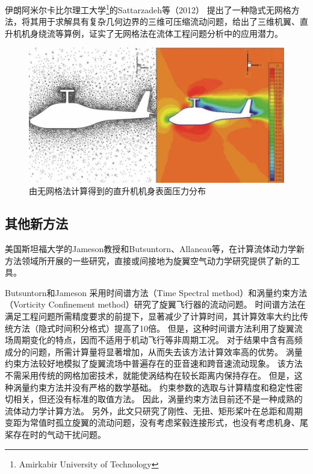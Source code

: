 \documentclass[doctor,openright,twoside,color]{buaathesis}
\begin{document}
伊朗阿米尔卡比尔理工大学\footnote{Amirkabir University of Technology}的Sattarzadeh等（2012）
提出了一种隐式无网格方法，将其用于求解具有复杂几何边界的三维可压缩流动问题，给出了三维机翼、直升机机身绕流等算例，证实了无网格法在流体工程问题分析中的应用潜力。
\begin{figure}[t!]
    \centering
    \includegraphics[height=0.3\textheight]{figures/meshless.jpg}
    \caption{由无网格法计算得到的直升机机身表面压力分布}
\end{figure}

\subsection{其他新方法}

美国斯坦福大学的Jameson教授和Butsuntorn、Allaneau等，在计算流体动力学新方法领域所开展的一些研究，直接或间接地为旋翼空气动力学研究提供了新的工具。

Butsuntorn和Jameson
采用时间谱方法（Time Spectral method）和涡量约束方法（Vorticity Confinement method）研究了旋翼飞行器的流动问题。
时间谱方法在满足工程问题所需精度要求的前提下，显著减少了计算时间，其计算效率大约比传统方法（隐式时间积分格式）提高了10倍。
但是，这种时间谱方法利用了旋翼流场周期变化的特点，因而不适用于机动飞行等非周期工况。
对于结果中含有高频成分的问题，所需计算量将显著增加，从而失去该方法计算效率高的优势。
涡量约束方法较好地模拟了旋翼流场中普遍存在的亚音速和跨音速流动现象。
该方法不需采用传统的网格加密技术，就能使涡结构在较长距离内保持存在。
但是，这种涡量约束方法并没有严格的数学基础。
约束参数的选取与计算精度和稳定性密切相关，但还没有标准的取值方法。
因此，涡量约束方法目前还不是一种成熟的流体动力学计算方法。
另外，此文只研究了刚性、无扭、矩形桨叶在总距和周期变距为常值时孤立旋翼的流动问题，没有考虑桨毂连接形式，也没有考虑机身、尾桨存在时的气动干扰问题。
\end{document}
